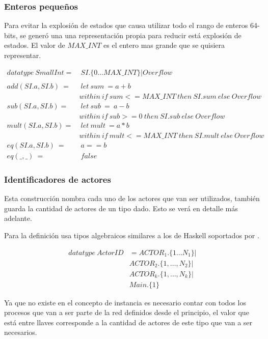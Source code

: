\subsubsection{Enteros pequeños}

Para evitar la explosión de estados que causa utilizar todo el rango de enteros 64-bits, se generó una una representación propia para reducir está explosión de estados. El valor de $MAX\_INT$ es el entero mas grande que se quisiera representar.

\begin{align*}
datatype\ SmallInt =&\ SI.\{0 \ldots MAX\_INT\} | Overflow \\
\\
add(SI.a, SI.b)\ =&\ let\ sum\ = a + b \\
&within\ if\ sum <= MAX\_INT\ then\ SI.sum\ else\ Overflow  \\
%
sub(SI.a, SI.b) =&\ let\ sub\ =\ a - b \\
& within\ if\ sub >= 0\ then\ SI.sub\ else\ Overflow \\
%
mult(SI.a, SI.b) =&\ let\ mult\ = a * b \\
& within\ if\ mult <= MAX\_INT\ then\ SI.mult\ else\ Overflow \\
eq(SI.a, SI.b)\ =&\ a == b \\
eq(\_, \_)\ =&\ false
\end{align*}

\subsubsection{Identificadores de actores}

Esta construcción nombra cada uno de los actores que van ser utilizados, también guarda la cantidad de actores de un tipo dado. Esto se verá en detalle más adelante.

Para la definición usa tipos algebraicos similares a los de Haskell soportados por \CSPm.

\begin{figure}[H]
\begin{align*}
  datatype\ ActorID &= ACTOR_1.\{1 \ldots N_1\} | \\
  & ACTOR_2.\{1, \ldots ,N_2\} | \\
  & ACTOR_k.\{1, \ldots, N_k\} | \\
  & Main.\{1\}
\end{align*}
\end{figure}

Ya que no existe en \CSP el concepto de instancia es necesario contar con todos los  procesos que van a ser parte de la red definidos desde el principio, el valor que está entre llaves corresponde a la cantidad de actores de este tipo que van a ser necesarios. 

